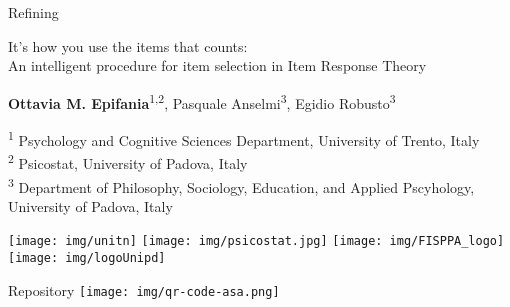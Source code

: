 \documentclass{beamer}
\begin{document}
\begin{frame}{Refining}
	
	\begin{center}
		\begin{Large}
				It's how you use the items that counts: \\ An intelligent procedure for item selection in Item Response Theory
		\end{Large}

		
		\small
		\vspace{5mm}
	\textbf{Ottavia M. Epifania}\textsuperscript{1,2}, Pasquale Anselmi\textsuperscript{3}, Egidio Robusto\textsuperscript{3}
		\small
		\vspace{3mm}
		
\textsuperscript{1} Psychology and Cognitive Sciences Department, University of Trento, Italy \\
\textsuperscript{2} Psicostat, University of Padova, Italy \\
\textsuperscript{3} Department of Philosophy, Sociology, Education, and Applied Pscyhology,	University of Padova, Italy
		
	\end{center}

\centering
\texttt{[image: img/unitn]} \hspace{5mm}
\texttt{[image: img/psicostat.jpg]} \hspace{5mm} 
\texttt{[image: img/FISPPA\_logo]} \hspace{5mm}  \texttt{[image: img/logoUnipd]}
\end{frame}

\begin{frame}{Repository}
	\vspace*{5mm}
		\centering
	\texttt{[image: img/qr-code-asa.png]}
\end{frame}
\end{document}
